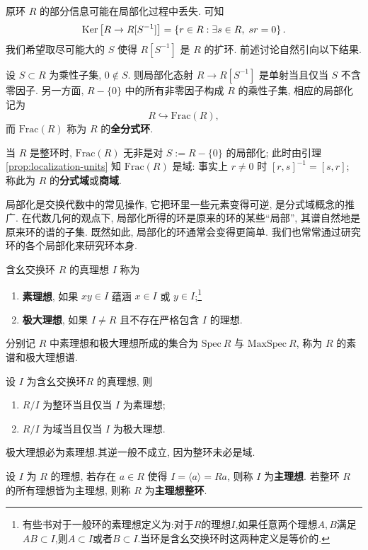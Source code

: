 原环 $R$ 的部分信息可能在局部化过程中丢失. 可知
\[ \operatorname{\mathrm{Ker}} \left[ R \to R[S^{-1}] \right] = \left\{r \in R : \exists s \in R, \; sr=0 \right\}. \]
我们希望取尽可能大的 $S$ 使得 $R[S^{-1}]$ 是 $R$ 的扩环. 前述讨论自然引向以下结果.
\begin{lemma}
	设 $S \subset R$ 为乘性子集, $0 \notin S$. 则局部化态射 $R \to R[S^{-1}]$ 是单射当且仅当 $S$ 不含零因子. 另一方面, $R - \{0\}$ 中的所有非零因子构成 $R$ 的乘性子集, 相应的局部化记为
	\[ R \hookrightarrow \text{Frac}(R), \]
	而 $\text{Frac}(R)$ 称为 $R$ 的\textbf{全分式环}.
	
	当 $R$ 是整环时, $\text{Frac}(R)$ 无非是对 $S := R - \{0\}$ 的局部化; 此时由引理 \ref{prop:localization-units} 知 $\text{Frac}(R)$ 是域: 事实上 $r \neq 0$ 时 $[r,s]^{-1} = [s,r]$; 称此为 $R$ 的\textbf{分式域}或\textbf{商域}. 
\end{lemma}

局部化是交换代数中的常见操作, 它把环里一些元素变得可逆, 是分式域概念的推广. 在代数几何的观点下, 局部化所得的环是原来的环的某些``局部'', 其谱自然地是原来环的谱的子集. 既然如此, 局部化的环通常会变得更简单. 我们也常常通过研究环的各个局部化来研究环本身.
\begin{definition}\label{def:ring-ideal}
	含幺交换环 $R$ 的真理想 $I$ 称为
	\begin{enumerate}
		\item \textbf{素理想}, 如果 $xy \in I$ 蕴涵 $x \in I$ 或 $y \in I$;\footnote{有些书对于一般环的素理想定义为:对于$R$的理想$I$,如果任意两个理想$A,B$满足$AB\subset I$,则$A\subset I$或者$B\subset I$.当环是含幺交换环时这两种定义是等价的.}
		\item \textbf{极大理想}, 如果 $I \neq R$ 且不存在严格包含 $I$ 的理想.
	\end{enumerate}
	分别记 $R$ 中素理想和极大理想所成的集合为 $\mathrm{Spec}\ R$ 与 $\mathrm{MaxSpec}\ R$, 称为 $R$ 的素谱和极大理想谱.
\end{definition}
\begin{proposition}\label{prop:prime-maximal-ideals}
	设 $I$ 为含幺交换环$R$ 的真理想, 则
	\begin{enumerate}
		\item $R/I$ 为整环当且仅当 $I$ 为素理想;
		\item $R/I$ 为域当且仅当 $I$ 为极大理想.
	\end{enumerate}
\end{proposition}
\begin{corollary}\label{prop:maximal-implies-prime}
	极大理想必为素理想.其逆一般不成立, 因为整环未必是域.
\end{corollary}
\begin{definition}\label{def:PID}
	设 $I$ 为 $R$ 的理想, 若存在 $a \in R$ 使得 $I = \langle a\rangle = Ra$, 则称 $I$ 为\textbf{主理想}. 若整环 $R$ 的所有理想皆为主理想, 则称 $R$ 为\textbf{主理想整环}.
\end{definition}

